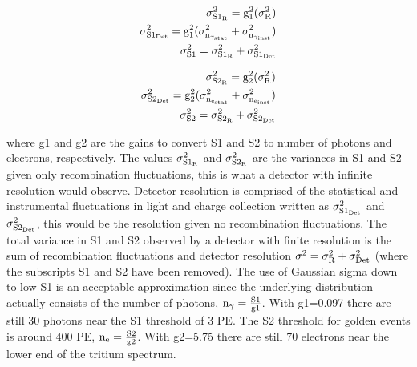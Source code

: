 \begin{equation}
\begin{split}
 \rm \sigma_{S1_R}^2=g_1^2(\sigma_R^2) \\
 \rm \sigma_{S1_{Det}}^2=g_1^2(\sigma_{n_{\gamma_{stat}}}^2+\sigma_{n_{\gamma_{inst}}}^2) \\
 \rm \sigma_{S1}^2=\sigma_{S1_R}^2 + \sigma_{S1_{Det}}^2
\label{eq:S1_res}
\end{split}
\end{equation}

\begin{equation}
\begin{split}
 \rm \sigma_{S2_R}^2=g_2^2(\sigma_R^2) \\
 \rm \sigma_{S2_{Det}}^2=g_2^2(\sigma_{n_{e_{stat}}}^2+\sigma_{n_{e_{inst}}}^2) \\
 \rm \sigma_{S2}^2=\sigma_{S2_R}^2 + \sigma_{S2_{Det}}^2
\label{eq:S2_res}
\end{split}
\end{equation}

\noindent where g1 and g2 are the gains to convert S1 and S2 to number of photons and electrons, respectively. The values $\rm \sigma_{S1_R}^2$ and $\rm \sigma_{S2_R}^2$ are the variances in S1 and S2 given only recombination fluctuations, this is what a detector with infinite resolution would observe. Detector resolution is comprised of the statistical and instrumental fluctuations in light and charge collection written as $\rm  \sigma_{S1_{Det}}^2$ and $\rm  \sigma_{S2_{Det}}^2$, this would be the resolution given no recombination fluctuations. The total variance in S1 and S2 observed by a detector with finite resolution is the sum of recombination fluctuations and detector resolution $\rm \sigma^2=\sigma_{R}^2 + \sigma_{Det}^2$ (where the subscripts S1 and S2 have been removed).
The use of Gaussian sigma down to low S1 is an acceptable approximation since the underlying distribution actually consists of the number of photons, $\rm n_\gamma = \frac{S1}{g1}$. With g1=0.097 there are still 30 photons near the S1 threshold of 3 PE. The S2 threshold for golden events is around 400 PE, $\rm n_e = \frac{S2}{g2}$. With g2=5.75 there are still 70 electrons near the lower end of the tritium spectrum.





